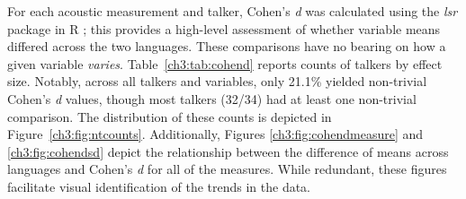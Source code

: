 For each acoustic measurement and talker, Cohen's \textit{d} was calculated using the \textit{lsr} package \citep{navarro_2015_lsr} in R \citep{r_2021}; this provides a high-level assessment of whether variable means differed across the two languages. These comparisons have no bearing on how a given variable \textit{varies}. Table~\ref{ch3:tab:cohend} reports counts of talkers by effect size. Notably, across all talkers and variables, only 21.1\% yielded non-trivial Cohen's \textit{d} values, though most talkers (32/34) had at least one non-trivial comparison. The distribution of these counts is depicted in Figure~\ref{ch3:fig:ntcounts}. Additionally, Figures \ref{ch3:fig:cohendmeasure} and \ref{ch3:fig:cohendsd} depict the relationship between the difference of means across languages and Cohen's \textit{d} for all of the measures. While redundant, these figures facilitate visual identification of the trends in the data.
 
